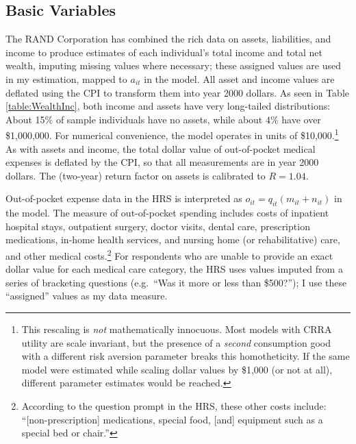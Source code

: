 \documentclass[12pt,pdftex,letterpaper]{article}
\newcommand{\Care}{m}
\newcommand{\Invst}{n}
\newcommand{\Assets}{a}
\newcommand{\Rfree}{R}
\newcommand{\Copay}{q}
\newcommand{\OOP}{o}
\begin{document}
\subsection{Basic Variables}

The RAND Corporation has combined the rich data on assets, liabilities, and income to produce estimates of each individual's total income and total net wealth, imputing missing values where necessary; these assigned values are used in my estimation, mapped to $\Assets_{it}$ in the model.  All asset and income values are deflated using the CPI to transform them into year 2000 dollars.  As seen in Table \ref{table:WealthInc}, both income and assets have very long-tailed distributions: About 15\% of sample individuals have no assets, while about 4\% have over \$1,000,000.  For numerical convenience, the model operates in units of \$10,000.\footnote{This rescaling is \textit{not} mathematically innocuous.  Most models with CRRA utility are scale invariant, but the presence of a \textit{second} consumption good with a different risk aversion parameter breaks this homotheticity.  If the same model were estimated while scaling dollar values by \$1,000 (or not at all), different parameter estimates would be reached.}  As with assets and income, the total dollar value of out-of-pocket medical expenses is deflated by the CPI, so that all measurements are in year 2000 dollars.  The (two-year) return factor on assets is calibrated to $\Rfree = 1.04$.

Out-of-pocket expense data in the HRS is interpreted as $\OOP_{it} = \Copay_{it}(\Care_{it} + \Invst_{it})$ in the model.  The measure of out-of-pocket spending includes costs of inpatient hospital stays, outpatient surgery, doctor visits, dental care, prescription medications, in-home health services, and nursing home (or rehabilitative) care, and other medical costs.\footnote{According to the question prompt in the HRS, these other costs include: ``[non-prescription] medications, special food, [and] equipment such as a special bed or chair.''} For respondents who are unable to provide an exact dollar value for each medical care category, the HRS uses values imputed from a series of bracketing questions (e.g.\ ``Was it more or less than \$500?''); I use these ``assigned'' values as my data measure.
\end{document}
